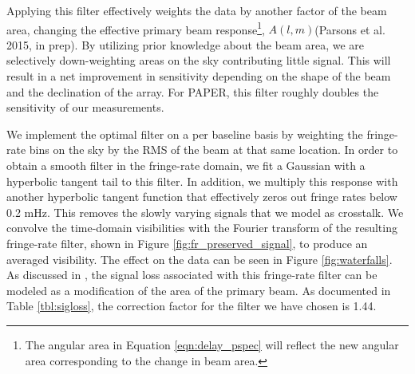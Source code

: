 \documentclass[twocolumn,numberedappendix]{emulateapj} \shorttitle{New Limits on the 21 cm Power Spectrum at $z=8.4$}
\newcommand{\parsonscitep}{(Parsons et al. 2015, in prep)}
\begin{document}
Applying this filter effectively weights the data by another factor of the beam
area, changing the effective primary beam response\footnote{The angular area in
Equation \eqref{eqn:delay_pspec} will reflect the new angular area
corresponding to the change in beam area.}, $A(l,m)$\parsonscitep.
By utilizing prior knowledge about the beam area, we are selectively
down-weighting areas on the sky contributing little signal. This will result in
a net improvement in sensitivity depending on the shape of the beam and the
declination of the array. For PAPER, this filter roughly doubles the
sensitivity of our measurements.  

We implement the optimal filter on a per baseline basis by weighting the
fringe-rate bins on the sky by the RMS of the beam at that same location.
In order to obtain a smooth filter in the fringe-rate domain, we fit a Gaussian
with a hyperbolic tangent tail to this filter. In addition, we multiply this
response with another hyperbolic tangent function that effectively zeros out
fringe rates below 0.2 mHz. This removes 
the slowly varying signals that we model as crosstalk. We convolve the
time-domain visibilities with the Fourier transform of the resulting fringe-rate
filter, shown in Figure \ref{fig:fr_preserved_signal}, to produce an averaged
visibility.  The effect on the data can be seen in Figure \ref{fig:waterfalls}.
As discussed in \citet{parsons_et_al2015}, the
signal loss associated with this fringe-rate filter can be modeled as a modification
of the area of the primary beam.  As documented in
Table \ref{tbl:sigloss}, the correction factor for the filter we have chosen is 1.44.



\end{document}
